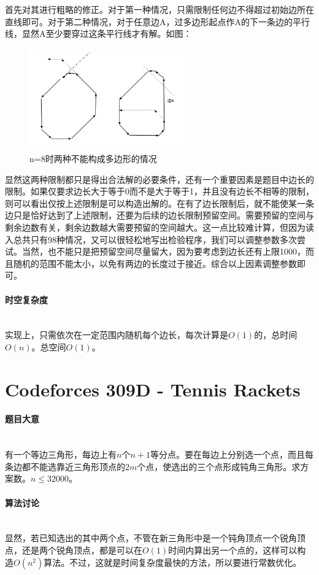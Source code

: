 \documentclass[UTF8]{ctexart}
\newcommand{\myparagraph}[1]{\paragraph{#1}\mbox{}\\}
\theoremstyle{nonumberplain}
\begin{document}
			首先对其进行粗略的修正。对于第一种情况，只需限制任何边不得超过初始边所在直线即可。对于第二种情况，对于任意边A，过多边形起点作A的下一条边的平行线，显然A至少要穿过这条平行线才有解。如图：
			
			\begin{figure}[ht]
				\centering
				\includegraphics[width=0.6\textwidth]{fig306d_2.png}
				\caption{n=8时两种不能构成多边形的情况}
			\end{figure}
			
			显然这两种限制都只是得出合法解的必要条件，还有一个重要因素是题目中边长的限制。如果仅要求边长大于等于0而不是大于等于1，并且没有边长不相等的限制，则可以看出仅按上述限制是可以构造出解的。在有了边长限制后，就不能使某一条边只是恰好达到了上述限制，还要为后续的边长限制预留空间。需要预留的空间与剩余边数有关，剩余边数越大需要预留的空间越大。这一点比较难计算，但因为读入总共只有98种情况，又可以很轻松地写出检验程序，我们可以调整参数多次尝试。当然，也不能只是把预留空间尽量留大，因为要考虑到边长还有上限1000，而且随机的范围不能太小，以免有两边的长度过于接近。综合以上因素调整参数即可。
		
		\myparagraph{时空复杂度}
		
			实现上，只需依次在一定范围内随机每个边长，每次计算是$O(1)$的，总时间$O(n)$。总空间$O(1)$。
	
	\section{Codeforces 309D - Tennis Rackets}
	
		\myparagraph{题目大意}
		
			有一个等边三角形，每边上有$n$个$n+1$等分点。要在每边上分别选一个点，而且每条边都不能选靠近三角形顶点的$2m$个点，使选出的三个点形成钝角三角形。求方案数。$n \leq 32000$。
		
		\myparagraph{算法讨论}
		
			显然，若已知选出的其中两个点，不管在新三角形中是一个钝角顶点一个锐角顶点，还是两个锐角顶点，都是可以在$O(1)$时间内算出另一个点的，这样可以构造$O(n^2)$算法。不过，这就是时间复杂度最快的方法，所以要进行常数优化。
			
\end{document}
